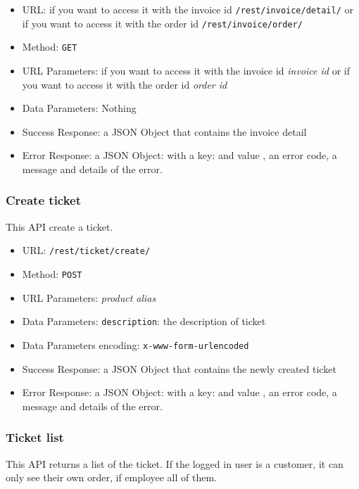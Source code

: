 \begin{itemize}
    \item URL: if you want to access it with the invoice id \texttt{/rest/invoice/detail/} or if you want to access it with the order id \texttt{/rest/invoice/order/}
    \item Method: \texttt{GET}
    \item URL Parameters: if you want to access it with the invoice id \textit{invoice id} or if you want to access it with the order id \textit{order id}
    \item Data Parameters: Nothing
    \item Success Response: a JSON Object that contains the invoice detail
    \item Error Response: a JSON Object: with a key:   and value , an error code, a message and details of the error.
\end{itemize}

\subsubsection*{Create ticket}

This API create a ticket.

\begin{itemize}
    \item URL: \texttt{/rest/ticket/create/}
    \item Method: \texttt{POST}
    \item URL Parameters: \textit{product alias}
    \item Data Parameters: \texttt{description}: the description of ticket
    \item Data Parameters encoding: \texttt{x-www-form-urlencoded}
    \item Success Response: a JSON Object that contains the newly created ticket
    \item Error Response: a JSON Object: with a key:   and value , an error code, a message and details of the error.
\end{itemize}

\subsubsection*{Ticket list}

This API returns a list of the ticket.
If the logged in user is a customer, it can only see their own order, if employee all of them.


